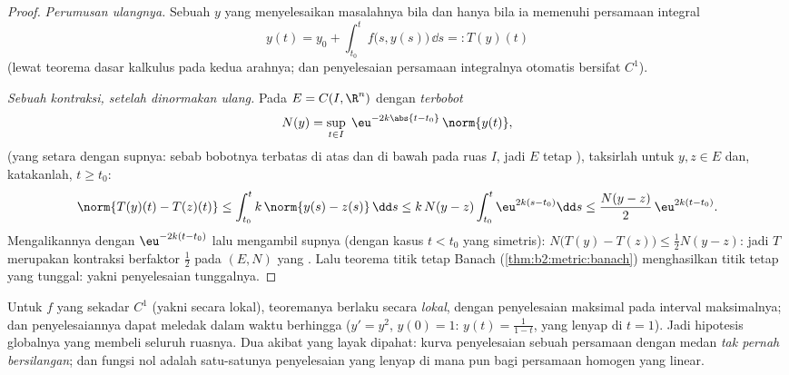 \begin{proof}
\emph{Perumusan ulangnya.} Sebuah $y$ yang  menyelesaikan masalahnya bila dan hanya bila ia
memenuhi persamaan integral
\[
y(t) = y_0 + \int_{t_0}^{t} f\bigl(s, y(s)\bigr)\,\dd s
=: T(y)(t)
\]
(lewat teorema dasar kalkulus pada kedua arahnya; dan penyelesaian 
persamaan integralnya otomatis bersifat $C^1$).

\emph{Sebuah kontraksi, setelah dinormakan ulang.} Pada  $E =
C(I, \R^n)$ dengan  \emph{terbobot}
\[
N(y) = \sup_{t \in I}\; \eu^{-2k\abs{t - t_0}}\,\norm{y(t)} ,
\]
(yang setara dengan  supnya: sebab bobotnya terbatas di atas dan di bawah
pada ruas $I$, jadi $E$ tetap ), taksirlah untuk $y, z \in
E$ dan, katakanlah, $t \geq t_0$:
\[
\norm{T(y)(t) - T(z)(t)}
\leq \int_{t_0}^{t} k\,\norm{y(s) - z(s)}\,\dd s
\leq k\,N(y - z)\int_{t_0}^{t} \eu^{2k(s - t_0)}\dd s
\leq \frac{N(y-z)}{2}\,\eu^{2k(t - t_0)} .
\]
Mengalikannya dengan $\eu^{-2k(t - t_0)}$ lalu mengambil supnya (dengan kasus $t
< t_0$ yang simetris): $N\bigl(T(y) - T(z)\bigr) \leq \frac12 N(y -
z)$: jadi $T$ merupakan kontraksi berfaktor $\frac12$ pada $(E, N)$ yang . Lalu
teorema titik tetap Banach (\cref{thm:b2:metric:banach}) menghasilkan
titik tetap yang tunggal: yakni penyelesaian tunggalnya.
\end{proof}

\begin{remark}
Untuk $f$ yang sekadar $C^1$ (yakni  secara lokal), teoremanya berlaku
secara \emph{lokal}, dengan penyelesaian maksimal pada interval  maksimalnya;
dan penyelesaiannya dapat meledak dalam waktu berhingga ($y' = y^2$, $y(0) = 1$: $y(t)
= \frac{1}{1-t}$, yang lenyap di $t = 1$). Jadi hipotesis  globalnya
yang membeli seluruh ruasnya. Dua akibat yang layak dipahat:
kurva penyelesaian sebuah persamaan  dengan medan  \emph{tak pernah bersilangan};
dan fungsi nol adalah satu-satunya penyelesaian yang lenyap di mana pun bagi
persamaan homogen yang linear.
\end{remark}

